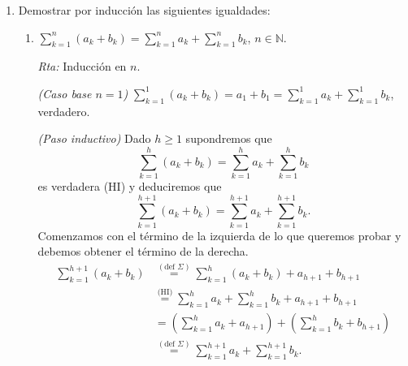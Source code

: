 \documentclass[a4paper,12pt,twoside,spanish,reqno]{amsbook}
\numberwithin{equation}{section}
\newcommand{\rta}{\noindent\textit{Rta: }}
\begin{document}
\begin{enumerate}
\begin{enumerate}
            
            \item $\forall n \in {\mathbb N}$,\ $3^n \ge 1 + 2^n$.
            
            \rta Inducción sobre $n$.
            
            \textit{(Caso base $n=1$) } En este caso $3^1 = 3$ y $1+2^1 = 3$, y se verifica la desigualdad.
            
            \textit{(Paso inductivo) } Debemos ver que si para $k \in \mathbb N$, tenemos que   $3^{k} \ge 1 + 2^k$ (HI),  entonces $3^{k+1} \ge 1 + 2^{k+1}$. 
            \begin{equation*}
            3^{k+1} = 3^k\cdot 3 \overset{\text{(HI)}}{\ge} (1 + 2^k) \cdot 3 = 3 + 3 \cdot 2^k \ge 1 + 2\cdot 2^k = 1 + 2^{k+1}.
            \end{equation*}
            
            
        \end{enumerate}
        
        
        
        \item\label{ej-induccion} Demostrar por inducción  las siguientes igualdades:
        \begin{enumerate}
            \item  $\displaystyle{ \sum_{k=1}^n (a_k + b_k) = \sum_{k=1}^n a_k + \sum_{k=1}^n b_k}$, $n\in \mathbb N$.
            
            \rta Inducción en $n$.
            
            \textit{(Caso base $n=1$) }  $\sum_{k=1}^1 (a_k + b_k) = a_1+b_1 = \sum_{k=1}^1 a_k + \sum_{k=1}^1 b_k$, verdadero.
            
            \textit{(Paso inductivo) } Dado $h \ge 1$ supondremos  que 
            $$\sum_{k=1}^h (a_k + b_k) = \sum_{k=1}^h a_k + \sum_{k=1}^h b_k$$ es verdadera (HI) y deduciremos que $$\sum_{k=1}^{h+1} (a_k + b_k) = \sum_{k=1}^{h+1} a_k + \sum_{k=1}^{h+1} b_k.$$
            Comenzamos con el término de la izquierda de lo que queremos probar  y debemos obtener el término de la derecha. 
            \begin{align*}
                \sum_{k=1}^{h+1} (a_k + b_k) &\overset{(\text{def } \Sigma)}{=}  \sum_{k=1}^h (a_k + b_k) + a_{h+1} + b_{h+1}\\ &\overset{\text{(HI)}}{=} \sum_{k=1}^h a_k + \sum_{k=1}^h b_k + a_{h+1} + b_{h+1}
                \\&= ( \sum_{k=1}^h a_k+a_{h+1} ) + ( \sum_{k=1}^h b_k + b_{h+1}) \\&\overset{(\text{def } \Sigma)}{=} \sum_{k=1}^{h+1} a_k + \sum_{k=1}^{h+1} b_k.
            \end{align*}
            

\end{enumerate}
\end{enumerate}
\end{document}
